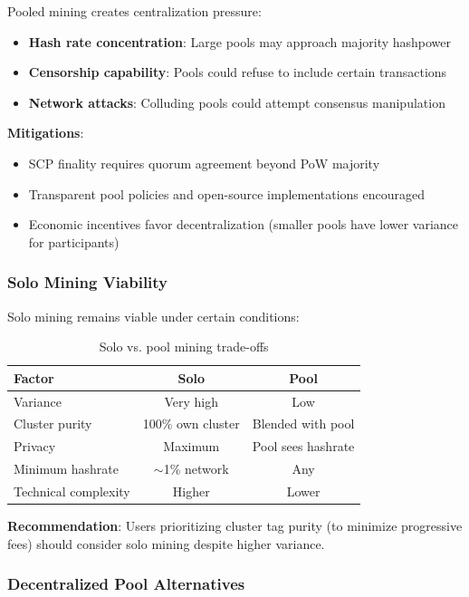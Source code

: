 Pooled mining creates centralization pressure:

\begin{itemize}
  \item \textbf{Hash rate concentration}: Large pools may approach majority
    hashpower
  \item \textbf{Censorship capability}: Pools could refuse to include certain
    transactions
  \item \textbf{Network attacks}: Colluding pools could attempt consensus
    manipulation
\end{itemize}

\textbf{Mitigations}:
\begin{itemize}
  \item SCP finality requires quorum agreement beyond PoW majority
  \item Transparent pool policies and open-source implementations encouraged
  \item Economic incentives favor decentralization (smaller pools have
    lower variance for participants)
\end{itemize}

\subsubsection{Solo Mining Viability}

Solo mining remains viable under certain conditions:

\begin{table}[h]
\centering
\caption{Solo vs. pool mining trade-offs}
\label{tab:solo-pool}
\begin{tabular}{@{}lcc@{}}
\toprule
\textbf{Factor} & \textbf{Solo} & \textbf{Pool} \\
\midrule
Variance & Very high & Low \\
Cluster purity & 100\% own cluster & Blended with pool \\
Privacy & Maximum & Pool sees hashrate \\
Minimum hashrate & $\sim$1\% network & Any \\
Technical complexity & Higher & Lower \\
\bottomrule
\end{tabular}
\end{table}

\textbf{Recommendation}: Users prioritizing cluster tag purity (to minimize
progressive fees) should consider solo mining despite higher variance.

\subsubsection{Decentralized Pool Alternatives}

